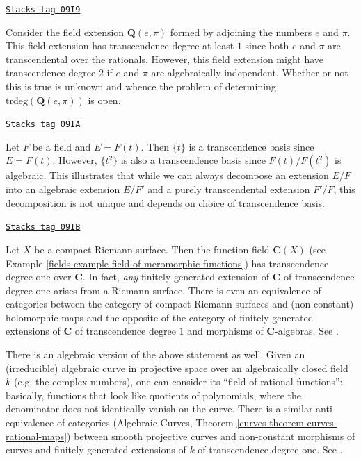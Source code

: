 \begin{example}[Pi e transcendental]
\label{fields-example-pi-e-transcendental}
\href{https://stacks.math.columbia.edu/tag/09I9}{\texttt{Stacks tag 09I9}}

Consider the field extension $\mathbf{Q}(e, \pi)$ formed by
adjoining the numbers $e$ and $\pi$. This field extension has transcendence
degree at least $1$ since both $e$ and $\pi$ are transcendental over the
rationals. However, this field extension might have transcendence
degree $2$ if $e$ and $\pi$ are algebraically independent. Whether or
not this is true is unknown and whence the problem of determining
$\text{trdeg}(\mathbf{Q}(e, \pi))$ is open.
\end{example}

\begin{example}
\label{fields-example-function-field-not-unique-transcendence-basis}
\href{https://stacks.math.columbia.edu/tag/09IA}{\texttt{Stacks tag 09IA}}

Let $F$ be a field and $E = F(t)$. Then $\{t\}$ is a
transcendence basis since $E = F(t)$. However, $\{t^2\}$
is also a transcendence basis since $F(t)/F(t^2)$ is algebraic.
This illustrates that while we can always decompose an extension
$E/F$ into an algebraic extension $E/F'$ and a
purely transcendental extension $F'/F$, this decomposition is not unique and
depends on choice of transcendence basis.
\end{example}

\begin{example}
\label{fields-example-riemann-surface-transcendence}
\href{https://stacks.math.columbia.edu/tag/09IB}{\texttt{Stacks tag 09IB}}

Let $X$ be a compact Riemann surface. Then the function field
$\mathbf{C}(X)$ (see Example \ref{fields-example-field-of-meromorphic-functions})
has transcendence degree one over $\mathbf{C}$. In fact, {\it any}
finitely generated extension of $\mathbf{C}$ of transcendence degree
one arises from a Riemann surface. There is even an equivalence of
categories between the category of compact Riemann surfaces and
(non-constant) holomorphic maps and the opposite of the category of finitely
generated extensions of $\mathbf{C}$ of transcendence degree $1$
and morphisms of $\mathbf{C}$-algebras. See \cite{Forster}.

\medskip\noindent
There is an algebraic version of the above statement as well. Given an
(irreducible) algebraic curve in projective space over an algebraically
closed field $k$ (e.g. the complex numbers), one can consider its
``field of rational functions'': basically, functions that look like
quotients of polynomials, where the denominator does not identically
vanish on the curve. There is a similar anti-equivalence of categories
(Algebraic Curves, Theorem \ref{curves-theorem-curves-rational-maps})
between smooth projective curves and
non-constant morphisms of curves and finitely generated extensions of $k$ of
transcendence degree one. See \cite{H}.
\end{example}

